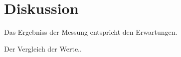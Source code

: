 \documentclass[11pt,a4paper,DIV=10,]{scrartcl}
\begin{document}
\section*{Diskussion}
Das Ergebniss der Messung entspricht den Erwartungen.

Der Vergleich der Werte..


\end{document}
